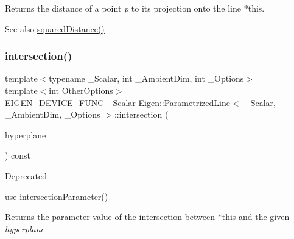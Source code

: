 \begin{DoxyReturn}{Returns}
the distance of a point {\itshape p} to its projection onto the line {\ttfamily $\ast$this}. 
\end{DoxyReturn}
\begin{DoxySeeAlso}{See also}
\mbox{\hyperlink{class_eigen_1_1_parametrized_line_a7dc9009fd67184754823cf90ae8f6eae}{squared\+Distance()}} 
\end{DoxySeeAlso}
\mbox{\label{class_eigen_1_1_parametrized_line_a512be7d79c7c982380e59ddf84d61252}} 
\subsubsection{\texorpdfstring{intersection()}{intersection()}}
{\footnotesize\ttfamily template$<$typename \+\_\+\+Scalar, int \+\_\+\+Ambient\+Dim, int \+\_\+\+Options$>$ \\
template$<$int Other\+Options$>$ \\
E\+I\+G\+E\+N\+\_\+\+D\+E\+V\+I\+C\+E\+\_\+\+F\+U\+NC \+\_\+\+Scalar \mbox{\hyperlink{class_eigen_1_1_parametrized_line}{Eigen\+::\+Parametrized\+Line}}$<$ \+\_\+\+Scalar, \+\_\+\+Ambient\+Dim, \+\_\+\+Options $>$\+::intersection (\begin{DoxyParamCaption}\item[{const \mbox{\hyperlink{class_eigen_1_1_hyperplane}{Hyperplane}}$<$ \+\_\+\+Scalar, \+\_\+\+Ambient\+Dim, Other\+Options $>$ \&}]{hyperplane }\end{DoxyParamCaption}) const\hspace{0.3cm}{\ttfamily [inline]}}

\begin{DoxyRefDesc}{Deprecated}
\item[\mbox{\hyperlink{deprecated__deprecated000029}{Deprecated}}]use intersection\+Parameter() \end{DoxyRefDesc}
\begin{DoxyReturn}{Returns}
the parameter value of the intersection between {\ttfamily $\ast$this} and the given {\itshape hyperplane} 
\end{DoxyReturn}
\mbox{\label{class_eigen_1_1_parametrized_line_ad476025bb806ab3c8fd14d2381139dbc}} 
